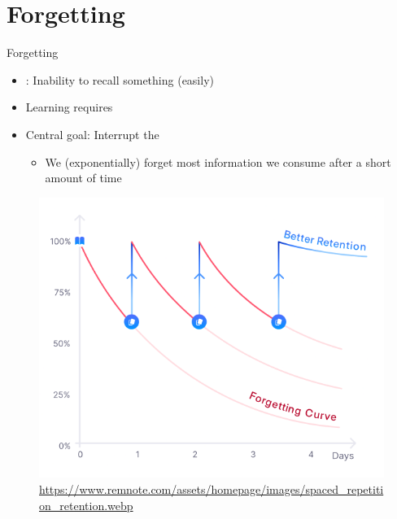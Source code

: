 \documentclass{ercisbeamer}
\begin{document}
\section{Forgetting}
\begin{frame}{Forgetting}
    \begin{itemize}
        \item {}: Inability to recall something (easily)
        \item Learning requires 
        \item Central goal: Interrupt the 
        \begin{itemize}
            \item We (exponentially) forget most information we consume after a short amount of time
        \end{itemize}
    \end{itemize}

    \begin{figure}
        \centering
        \includegraphics[width=0.35\paperwidth]{04_resources/forgetting_curve_remnote.png}
        \vspace{-0.5em}
        \caption{\tiny \url{https://www.remnote.com/assets/homepage/images/spaced_repetition_retention.webp}}
    \end{figure}
\end{frame}
\end{document}
